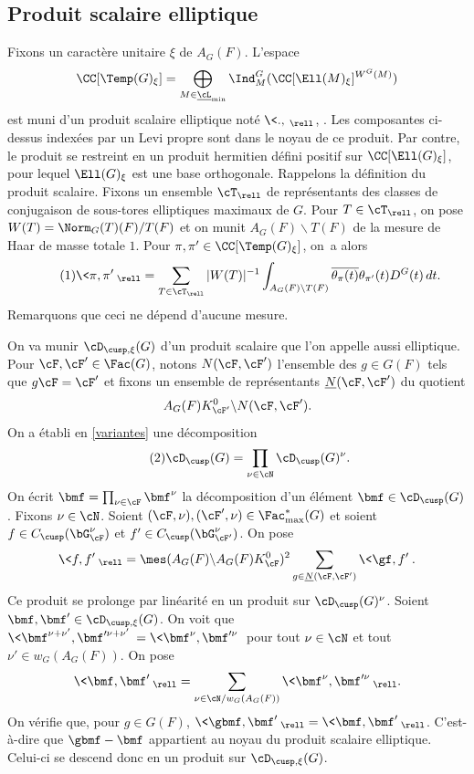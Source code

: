 \subsection{Produit scalaire elliptique}\label{produitscalaireelliptique}
Fixons un caractère unitaire $\xi$ de $A_{G}(F)$. L'espace
\[
\CC[\Temp(G)_{\xi}]=\bigoplus_{M\in\underline{\cL}_{\min}}\Ind_{M}^G(\CC[\Ell(M)_{\xi}]^{W^G(M)})
\]
est muni d'un produit scalaire elliptique noté $\<.,\>_{\rell}$, \cf \cite[\S6]{A2}. Les composantes ci-dessus indexées par un Levi propre sont dans le noyau de ce produit. Par contre, le produit se restreint en un produit hermitien défini positif sur $\CC[\Ell(G)_{\xi}]$, pour lequel $\Ell(G)_{\xi}$ est une base orthogonale. Rappelons la définition du produit scalaire. Fixons un ensemble $\cT_{\rell}$ de représentants des classes de conjugaison de sous-tores elliptiques maximaux de $G$. Pour $T\in \cT_{\rell}$, on pose $W(T)=\Norm_{G}(T)(F)/T(F)$ et on munit $A_{G}(F)\backslash T(F)$ de la mesure de Haar de masse totale $1$. Pour $\pi,\pi'\in \CC[\Temp(G)_{\xi}]$, on~a alors
\begin{equation}\tag{1}\label{produitscalaireelliptique1}
\<\pi,\pi'\>_{\rell}=\sum_{T\in \cT_{\rell}}\vert W(T)\vert ^{-1}\int_{A_{G}(F)\backslash T(F)}\overline{\theta_{\pi}(t)}\theta_{\pi'}(t)D^G(t)\,dt.
\end{equation}
Remarquons que ceci ne dépend d'aucune mesure.

On va munir $\cD_{\cusp,\xi}(G)$ d'un produit scalaire que l'on appelle aussi elliptique. Pour $\cF,\cF'\in \Fac(G)$,
notons $N(\cF,\cF')$ l'ensemble des $g\in G(F)$ tels que $g\cF=\cF'$ et fixons un ensemble de représentants $\underline{N}(\cF,\cF')$ du quotient
\[
A_{G}(F)K_{\cF'}^0\backslash N(\cF,\cF').
\]
On a établi en \ref{variantes} une décomposition
\begin{equation}\tag{2}\label{produitscalaireelliptique2}
\boldsymbol{\cD}_{\cusp}(G)=\prod_{\nu\in \cN}
\boldsymbol{\cD}_{\cusp}(G)^{\nu}.
\end{equation}
On écrit $\bmf=\prod_{\nu\in \cF}\bmf^{\nu}$ la décomposition d'un élément $\bmf\in \boldsymbol{\cD}_{\cusp}(G)$.
Fixons $\nu\in \cN$. Soient $(\cF,\nu),(\cF',\nu)\in \Fac^*_{\max}(G)$ et soient
$f\in C_{\cusp}(\bG_{\cF}^{\nu})$ et $f'\in C_{\cusp}(\bG_{\cF'}^{\nu})$. On pose
\[
\<f,f'\>_{\rell}= \mes(A_{G}(F)\backslash A_{G}(F)K_{\cF}^0)^2\sum_{g\in \underline{N}(\cF,\cF')}\<{\gf},f'\>.
\]
Ce produit se prolonge par linéarité en un produit sur $\boldsymbol{\cD}_{\cusp}(G)^{\nu}$.
Soient $\bmf, \bmf'\in \boldsymbol{\cD}_{\cusp,\xi}(G)$. On voit que $\<\bmf^{\nu+\nu'},\bmf^{\prime\nu+\nu'}\>=\<\bmf^{\nu},\bmf^{\prime\nu}\>$ pour tout $\nu\in \cN$ et tout $\nu'\in w_{G}(A_{G}(F))$. On pose
\[
\<\bmf,\bmf'\>_{\rell}=\sum_{\nu\in \cN/w_{G}(A_{G}(F))}\<\bmf^{\nu},\bmf^{\prime\nu}\>_{\rell}.
\]
On vérifie que, pour $g\in G(F)$, $\<{\gbmf},\bmf'\>_{\rell}=\<\bmf,\bmf'\>_{\rell}$. C'est-à-dire que $\gbmf-\bmf$ appartient au noyau du produit scalaire elliptique. Celui-ci se descend donc en un produit sur $\cD_{\cusp,\xi}(G)$.


